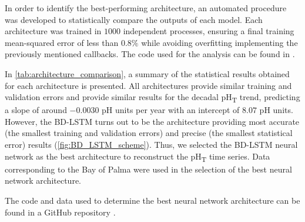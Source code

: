 In order to identify the best-performing architecture, an
automated procedure was developed to statistically compare the outputs of each
model. Each architecture was trained in $1000$ independent processes, ensuring
a final training mean-squared error of less than $0.8\%$ while avoiding
overfitting implementing the previously mentioned callbacks. The code used for
the analysis can be found in \cite{CODE}.

In \cref{tab:architecture_comparison}, a summary of the statistical results
obtained for each architecture is presented. All architectures provide similar
training and validation errors and provide similar results for the decadal
pH\textsubscript{T} trend, predicting a slope of around $-0.0030$ pH units per
year with an intercept of $8.07$ pH units. However, the BD-LSTM turns out to be
the architecture providing most accurate (the smallest training and validation
errors) and precise (the smallest statistical error) results
(\cref{fig:BD_LSTM_scheme}). Thus, we selected the BD-LSTM neural network as
the best architecture to reconstruct the pH\textsubscript{T} time series.
Data corresponding to the Bay of Palma were used in the selection of the
best neural network architecture.

\begin{table}[H]
    \centering
    \caption[Statistical comparison between different RNN
        architectures]{Statistical comparison between different RNN
        architectures}
    \label{tab:architecture_comparison}
\end{table}

\noindent The code and data used to determine the best neural network
architecture can be found in a GitHub repository \cite{CODE_ph}.

